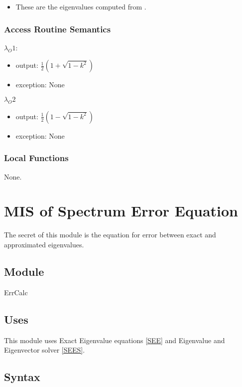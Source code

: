 \documentclass[12pt, titlepage]{article}
\begin{document}
\begin{itemize}
	\item These are the eigenvalues computed from \citet{SegaletAl}. 
\end{itemize}

\subsubsection{Access Routine Semantics}


$\lambda_O1$:
\begin{itemize}
	\item output: $\frac{1}{2} (1+\sqrt{1-k^{2}})$ 
	\item exception: None
\end{itemize}


\noindent $\lambda_O2$
\begin{itemize} 
	\item output: $\frac{1}{2} (1-\sqrt{1-k^{2}})$ 
	\item exception: None
\end{itemize}

\subsubsection{Local Functions} 

None. 

\newpage

\section{MIS of Spectrum Error Equation} \label{MSEE}

The secret of this module is the equation for error between exact and 
approximated eigenvalues.

\subsection{Module}

ErrCalc

\subsection{Uses}

This module uses Exact Eigenvalue equations \ref{SEE} and Eigenvalue and 
Eigenvector solver 
\ref{SEES}. 

\subsection{Syntax}
\end{document}
